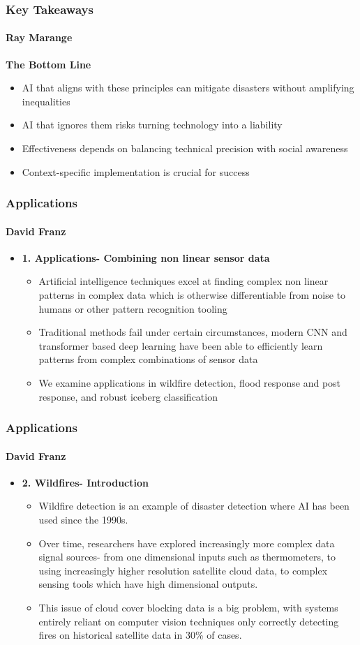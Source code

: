 \documentclass{beamer}
\newcommand{\namedframe}[3]{
  \begin{frame}
    \frametitle{#2}
    \framesubtitle{#1}
    #3
  \end{frame}
}
\begin{document}
\namedframe{Ray Marange}{Key Takeaways}{
\textbf{The Bottom Line}
\begin{itemize}
  \item AI that aligns with these principles can mitigate disasters without amplifying inequalities
  \item AI that ignores them risks turning technology into a liability
  \item Effectiveness depends on balancing technical precision with social awareness
  \item Context-specific implementation is crucial for success
\end{itemize}
}


\namedframe{David Franz}{Applications}{
\begin{itemize}
    \item \textbf{1. Applications- Combining non linear sensor data}
    \begin{itemize}
        \item Artificial intelligence techniques excel at finding complex non linear patterns in complex data which is otherwise differentiable from noise to humans or other pattern recognition tooling
        \item Traditional methods fail under certain circumstances, modern CNN and transformer based deep learning have been able to efficiently learn patterns from complex combinations of sensor data
        \item We examine applications in wildfire detection, flood response and post response, and robust iceberg classification
    \end{itemize}
\end{itemize}
}

\namedframe{David Franz}{Applications}{
\begin{itemize}
    \item \textbf{2. Wildfires- Introduction}
    \begin{itemize}
        \item Wildfire detection is an example of disaster detection where AI has been used since the 1990s.
        \item Over time, researchers have explored increasingly more complex data signal sources- from one dimensional inputs such as thermometers, to using increasingly higher resolution satellite cloud data, to complex sensing tools which have high dimensional outputs. 
        \item This issue of cloud cover blocking data is a big problem, with systems entirely reliant on computer vision techniques only correctly detecting fires on historical satellite data in 30\% of cases.
    \end{itemize}
\end{itemize}
}
\end{document}
